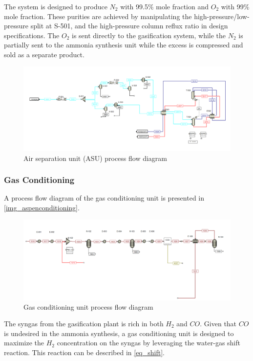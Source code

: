 \documentclass[a4paper, titlepage]{article}
\begin{document}
The system is designed to produce $N_2$ with 99.5\% mole fraction and $O_2$ with 99\% mole fraction. These purities
are achieved by manipulating the high-pressure/low-pressure split at S-501, and the high-pressure column
reflux ratio in design specifications. The $O_2$ is sent directly to the gasification system, while the $N_2$ is
partially sent to the ammonia synthesis unit while the excess is compressed and sold as a separate product.

\begin{figure}[htb]
    \includegraphics[width=\textwidth]{img/aspen_asu.png}
    \caption{Air separation unit (ASU) process flow diagram}
    \label{img_aspenasu}
\end{figure}

\subsubsection{Gas Conditioning}

A process flow diagram of the gas conditioning unit is presented in \autoref{img_aspenconditioning}.

\begin{figure}[htb]
    \includegraphics[width=\textwidth]{img/aspen_conditioning.png}
    \caption{Gas conditioning unit process flow diagram}
    \label{img_aspenconditioning}
\end{figure}

The syngas from the gasification plant is rich in both $H_2$ and $CO$. Given that $CO$ is undesired in the
ammonia synthesis, a gas conditioning unit is designed to maximize the $H_2$ concentration on the syngas by leveraging
the water-gas shift reaction. This reaction can be described in \autoref{eq_shift}.
\end{document}
